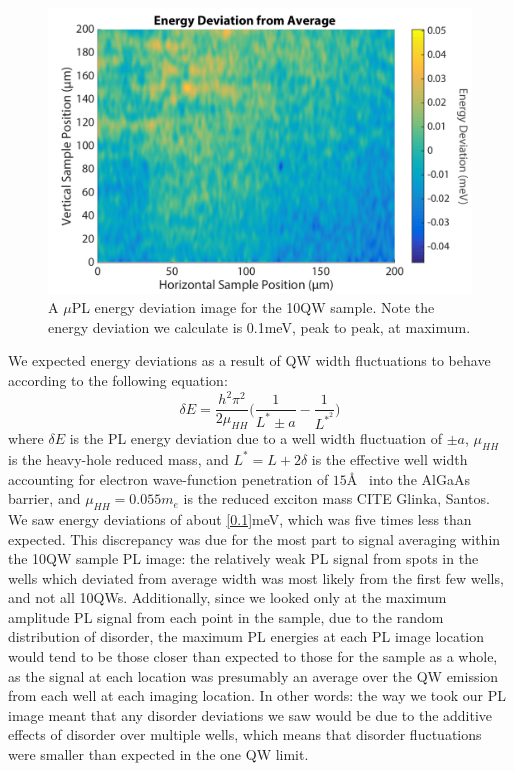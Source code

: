\begin{figure}[h!]
\centering
\includegraphics[width = .8\textwidth]{10QW_devplot.png}
\caption{ \doublespacing A $\mu$PL energy deviation image for the 10QW sample. Note the energy deviation we calculate is 0.1meV, peak to peak, at maximum.}
\label{devmap10QW}
\end{figure}

\newpage
\indent We expected energy deviations as a result of QW width fluctuations to behave according to the following equation:
\begin{equation}
\delta E = \frac{h^2 \pi^2}{2 \mu_{HH}}\Big ( \frac{1}{L^* \pm a}- \frac{1}{L^{*^2}} \Big )
\end{equation}
where $\delta E$ is the PL energy deviation due to a well width fluctuation of $\pm a$, $\mu_{HH}$ is the heavy-hole reduced mass, and $L^* = L+2\delta$ is the effective well width accounting for electron wave-function penetration of $15$\AA ~ into the AlGaAs barrier, and $\mu_{HH} = 0.055m_e$ is the reduced exciton mass CITE Glinka, Santos. We saw energy deviations of about \ref{0.1}meV, which was five times less than expected. This discrepancy was due for the most part to signal averaging within the 10QW sample PL image: the relatively weak PL signal from spots in the wells which deviated from average width was most likely from the first few wells, and not all 10QWs. Additionally, since we looked only at the maximum amplitude PL signal from each point in the sample, due to the random distribution of disorder, the maximum PL energies at each PL image location would tend to be those closer than expected to those for the sample as a whole, as the signal at each location was presumably an average over the QW emission from each well at each imaging location. In other words: the way we took our PL image meant that any disorder deviations we saw would be due to the additive effects of disorder over multiple wells, which means that disorder fluctuations were smaller than expected in the one QW limit.

